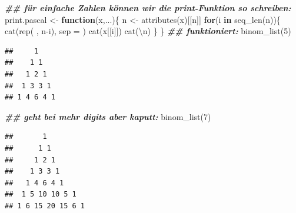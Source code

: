 \documentclass[
]{book}
\newenvironment{Shaded}{\begin{snugshade}}{\end{snugshade}}
\newcommand{\AttributeTok}[1]{\textcolor[rgb]{0.77,0.63,0.00}{#1}}
\newcommand{\ControlFlowTok}[1]{\textcolor[rgb]{0.13,0.29,0.53}{\textbf{#1}}}
\newcommand{\DecValTok}[1]{\textcolor[rgb]{0.00,0.00,0.81}{#1}}
\newcommand{\DocumentationTok}[1]{\textcolor[rgb]{0.56,0.35,0.01}{\textbf{\textit{#1}}}}
\newcommand{\FunctionTok}[1]{\textcolor[rgb]{0.00,0.00,0.00}{#1}}
\newcommand{\NormalTok}[1]{#1}
\newcommand{\OtherTok}[1]{\textcolor[rgb]{0.56,0.35,0.01}{#1}}
\newcommand{\SpecialCharTok}[1]{\textcolor[rgb]{0.00,0.00,0.00}{#1}}
\newcommand{\StringTok}[1]{\textcolor[rgb]{0.31,0.60,0.02}{#1}}
\begin{document}
\begin{Shaded}
\begin{Highlighting}[]
\DocumentationTok{\#\# für einfache Zahlen können wir die print{-}Funktion so schreiben:}
\NormalTok{print.pascal }\OtherTok{\textless{}{-}} \ControlFlowTok{function}\NormalTok{(x,...)\{}
\NormalTok{  n }\OtherTok{\textless{}{-}} \FunctionTok{attributes}\NormalTok{(x)[[}\StringTok{\textquotesingle{}n\textquotesingle{}}\NormalTok{]]}
  \ControlFlowTok{for}\NormalTok{(i }\ControlFlowTok{in} \FunctionTok{seq\_len}\NormalTok{(n))\{}
    \FunctionTok{cat}\NormalTok{(}\FunctionTok{rep}\NormalTok{(}\StringTok{\textquotesingle{} \textquotesingle{}}\NormalTok{, n}\SpecialCharTok{{-}}\NormalTok{i), }\AttributeTok{sep =} \StringTok{\textquotesingle{}\textquotesingle{}}\NormalTok{)}
    \FunctionTok{cat}\NormalTok{(x[[i]])}
    \FunctionTok{cat}\NormalTok{(}\StringTok{\textquotesingle{}}\SpecialCharTok{\textbackslash{}n}\StringTok{\textquotesingle{}}\NormalTok{)}
\NormalTok{  \}}
\NormalTok{\}}
\DocumentationTok{\#\# funktioniert:}
\FunctionTok{binom\_list}\NormalTok{(}\DecValTok{5}\NormalTok{)}
\end{Highlighting}
\end{Shaded}

\begin{verbatim}
##     1
##    1 1
##   1 2 1
##  1 3 3 1
## 1 4 6 4 1
\end{verbatim}

\begin{Shaded}
\begin{Highlighting}[]
\DocumentationTok{\#\# geht bei mehr digits aber kaputt:}
\FunctionTok{binom\_list}\NormalTok{(}\DecValTok{7}\NormalTok{)}
\end{Highlighting}
\end{Shaded}

\begin{verbatim}
##       1
##      1 1
##     1 2 1
##    1 3 3 1
##   1 4 6 4 1
##  1 5 10 10 5 1
## 1 6 15 20 15 6 1
\end{verbatim}
\end{document}
